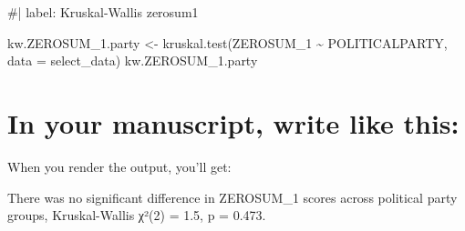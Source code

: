 \documentclass[
  english,
  letterpaper,
  DIV=11,
  numbers=noendperiod]{scrreprt}
\newenvironment{Shaded}{\begin{snugshade}}{\end{snugshade}}
\newcommand{\InformationTok}[1]{\textcolor[rgb]{0.37,0.37,0.37}{#1}}
\newcommand{\NormalTok}[1]{\textcolor[rgb]{0.00,0.23,0.31}{#1}}
\begin{document}
\begin{Shaded}
\begin{Highlighting}[]
\NormalTok{\#| label: Kruskal{-}Wallis zerosum1}

\NormalTok{kw.ZEROSUM\_1.party \textless{}{-} kruskal.test(ZEROSUM\_1 \textasciitilde{} POLITICALPARTY, data = select\_data)}
\NormalTok{kw.ZEROSUM\_1.party}
\end{Highlighting}
\end{Shaded}

\section{In your manuscript, write like
this:}\label{in-your-manuscript-write-like-this-4}

\begin{Shaded}
\end{Shaded}

When you render the output, you'll get:

\begin{Shaded}
\begin{Highlighting}[]
\NormalTok{There was no significant difference in ZEROSUM\_1 scores across political party groups, }
\NormalTok{Kruskal{-}Wallis χ²(2) = 1.5, p = 0.473.}
\end{Highlighting}
\end{Shaded}
\end{document}
